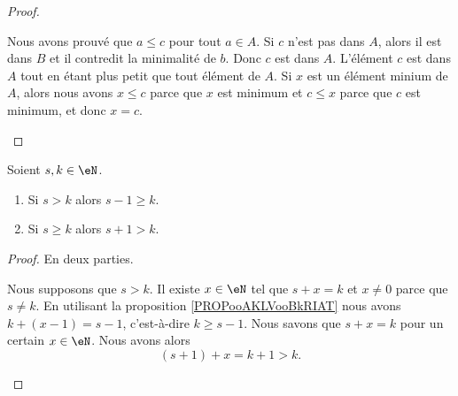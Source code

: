 \begin{proof}
\begin{subproof}
		Nous avons prouvé que \( a\leq c\) pour tout \( a\in A\).
		\spitem[\( c\in A\)]
		Si \( c\) n'est pas dans \( A\), alors il est dans \( B\) et il contredit la minimalité de \( b\). Donc \( c\) est dans \( A\).
		\spitem[Conclusion]
		L'élément \( c\) est dans \( A\) tout en étant plus petit que tout élément de \( A\).
		\spitem[Unicité]
		Si \( x\) est un élément minium de \( A\), alors nous avons \( x\leq c\) parce que \( x\) est minimum et \( c\leq x\) parce que \( c\) est minimum, et donc \( x=c\).
	\end{subproof}
\end{proof}

\begin{proposition}	\label{PROPooTQDJooFQGFpC}
	Soient \( s,k\in \eN\).
	\begin{enumerate}
		\item		\label{ITEMooPQETooJYjhUj}
		      Si \( s>k\) alors \( s-1\geq k\).
		\item		\label{ITEMooZLXQooPRLNoN}
		      Si \( s\geq k\) alors \( s+1>k\).
	\end{enumerate}
\end{proposition}

\begin{proof}
	En deux parties.
	\begin{subproof}
		Nous supposons que \( s>k\). Il existe \( x\in \eN\) tel que \( s+x=k\) et \( x\neq 0\) parce que \( s\neq k\). En utilisant la proposition \ref{PROPooAKLVooBkRIAT} nous avons \( k+(x-1)=s-1\), c'est-à-dire \( k\geq s-1\).
		Nous savons que \( s+x=k\) pour un certain \( x\in \eN\). Nous avons alors
		\begin{equation}
			(s+1)+x=k+1>k.
		\end{equation}
	\end{subproof}
\end{proof}



